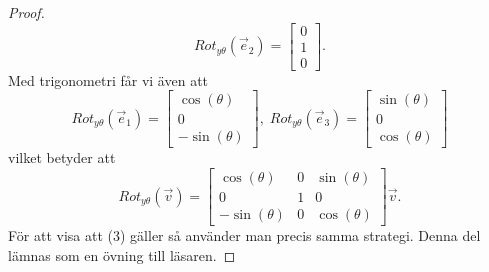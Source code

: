 \documentclass{article}
\theoremstyle{definition}
\begin{document}
\begin{proof}
  \[Rot_{y\theta} (\vec{e}_2) = 
  \begin{bmatrix}
    0 \\
    1 \\
    0
  \end{bmatrix}.
  \]
  Med trigonometri får vi även att 
  \[Rot_{y\theta} (\vec{e}_1) = 
  \begin{bmatrix}
    \cos(\theta) \\
    0 \\
    -\sin(\theta)
  \end{bmatrix}, \; Rot_{y\theta} (\vec{e}_3) = 
  \begin{bmatrix}
    \sin(\theta) \\
    0 \\
    \cos(\theta)
  \end{bmatrix}
  \]
  vilket betyder att 
  \[Rot_{y\theta} (\vec{v}) = 
  \begin{bmatrix}
    \cos(\theta) & 0 & \sin(\theta) \\
    0 & 1 & 0 \\
    -\sin(\theta) & 0 & \cos(\theta)
  \end{bmatrix} \vec{v}.\]
  För att visa att (3) gäller så använder man precis samma strategi. Denna del lämnas 
  som en övning till läsaren.
\end{proof}
\end{document}
